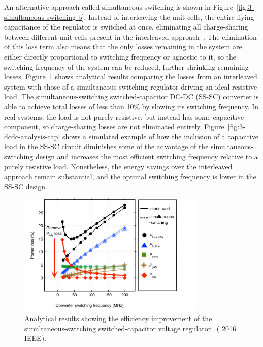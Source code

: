 \documentclass[graybox]{svmult}
\begin{document}
An alternative approach called simultaneous switching is shown in Figure~\ref{fig:3-simultaneous-switching-b}.
Instead of interleaving the unit cells, the entire flying capacitance of the regulator is switched at once, eliminating all charge-sharing between different unit cells present in the interleaved approach~\cite{Zimmer2016}.
The elimination of this loss term also means that the only losses remaining in the system are either directly proportional to switching frequency or agnostic to it, so the switching frequency of the system can be reduced, further shrinking remaining losses.
Figure~\ref{fig:3-dcdc-analysis} shows analytical results comparing the losses from an interleaved system with those of a simultaneous-switching regulator driving an ideal resistive load.
The simultaneous-switching switched-capacitor DC-DC (SS-SC) converter is able to achieve total losses of less than 10\% by slowing its switching frequency.
In real systems, the load is not purely resistive, but instead has some capacitive component, so charge-sharing losses are not eliminated entirely.
Figure~\ref{fig:3-dcdc-analysis-cap} shows a simulated example of how the inclusion of a capacitive load in the SS-SC circuit diminishes some of the advantage of the simultaneous-switching design and increases the most efficient switching frequency relative to a purely resistive load.
Nonetheless, the energy savings over the interleaved approach remain substantial, and the optimal switching frequency is lower in the SS-SC design.

\begin{figure}
  \centering
  \includegraphics[width=0.8\textwidth]{3-dcdc-analysis}
  \caption{Analytical results showing the efficiency improvement of the simultaneous-switching switched-capacitor voltage regulator~\cite{Zimmer2016} ({\textcopyright} 2016 IEEE).}
  \label{fig:3-dcdc-analysis}
\end{figure}
\end{document}
